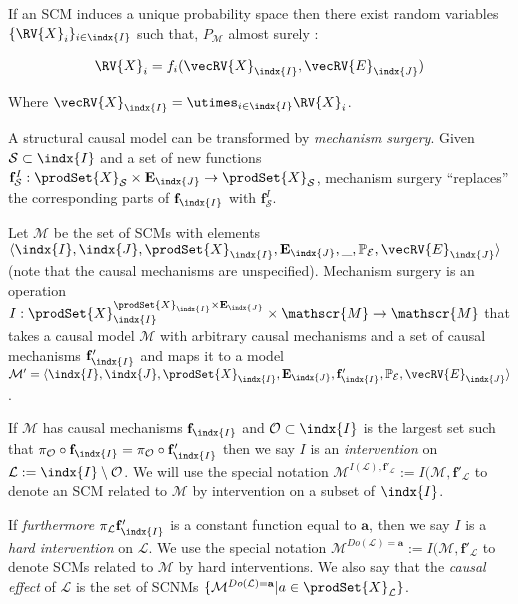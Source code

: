 If an SCM induces a unique probability space then there exist random variables $\{\RV{X}_i\}_{i\in\indx{I}}$ such that, $P_{\mathcal{M}}$ almost surely \citet{bongers_theoretical_2016}:

\begin{align}
    \RV{X}_i = f_i({\vecRV{X}}_{\indx{I}},{\vecRV{E}}_{\indx{J}})
\end{align}

Where ${\vecRV{X}}_{\indx{I}} = \utimes_{i\in \indx{I}} \RV{X}_i$.

A structural causal model can be transformed by \emph{mechanism surgery}. Given $\mathcal{S}\subset\indx{I}$ and a set of new functions $\mathbf{f}^I_{\mathcal{S}}:\prodSet{X}_{\mathcal{S}}\times\mathbf{E}_{\indx{J}}\to\prodSet{X}_{\mathcal{S}}$, mechanism surgery ``replaces'' the corresponding parts of $\mathbf{f}_{\indx{I}}$ with $\mathbf{f}^I_{\mathcal{S}}$.

\begin{definition}
Let $\mathscr{M}$ be the set of SCMs with elements $\langle \indx{I},\indx{J},\prodSet{X}_{\indx{I}},\mathbf{E}_{\indx{J}},\_,\mathbb{P}_{\mathcal{E}},{\vecRV{E}}_{\indx{J}}\rangle$ (note that the causal mechanisms are unspecified). Mechanism surgery is an operation $I:\prodSet{X}_{\indx{I}}^{\prodSet{X}_{\indx{I}}\times\mathbf{E}_{\indx{J}}}\times \mathscr{M}\to\mathscr{M}$ that takes a causal model $\mathcal{M}$ with arbitrary causal mechanisms and a set of causal mechanisms $\mathbf{f}'_{\indx{I}}$ and maps it to a model $\mathcal{M}'=\langle \indx{I},\indx{J},\prodSet{X}_{\indx{I}},\mathbf{E}_{\indx{J}},\mathbf{f}'_{\indx{I}},\mathbb{P}_{\mathcal{E}},{\vecRV{E}}_{\indx{J}}\rangle$.

If $\mathcal{M}$ has causal mechanisms $\mathbf{f}_{\indx{I}}$ and $\mathcal{O}\subset\indx{I}$ is the largest set such that $\pi_{\mathcal{O}}\circ\mathbf{f}_{\indx{I}}=\pi_{\mathcal{O}}\circ\mathbf{f}'_{\indx{I}}$ then we say $I$ is an \emph{intervention} on $\mathcal{L}:=\indx{I}\setminus\mathcal{O}$. We will use the special notation $\mathcal{M}^{I(\mathcal{L}),\mathbf{f}'_{\mathcal{L}}}:=I(\mathcal{M},\mathbf{f}'_{\mathcal{L}}$ to denote an SCM related to $\mathcal{M}$ by intervention on a subset of $\indx{I}$.

If \emph{furthermore} $\pi_{\mathcal{L}}\mathbf{f}'_{\indx{I}}$ is a constant function equal to $\mathbf{a}$, then we say $I$ is a \emph{hard intervention} on $\mathcal{L}$. We use the special notation $\mathcal{M}^{Do(\mathcal{L})=\mathbf{a}}:=I(\mathcal{M},\mathbf{f}'_{\mathcal{L}}$ to denote SCMs related to $\mathcal{M}$ by hard interventions. We also say that the \emph{causal effect} of $\mathcal{L}$ is the set of SCNMs $\{\mathcal{M}^{Do(\mathcal{L})=\mathbf{a}}|a\in \prodSet{X}_{\mathcal{L}}\}$.
\end{definition}

